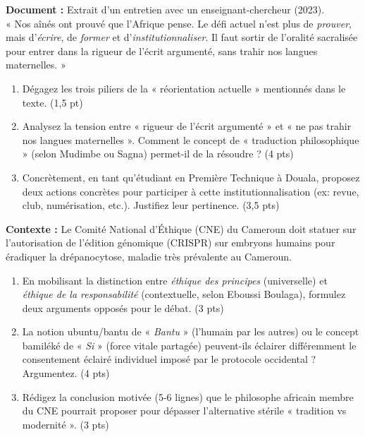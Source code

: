 \documentclass[11pt]{article}
\begin{document}
\begin{exercice}
\textbf{Document :} Extrait d'un entretien avec un enseignant-chercheur (2023).\\
« Nos aînés ont prouvé que l'Afrique pense. Le défi actuel n'est plus de \textit{prouver}, mais d'\textit{écrire}, de \textit{former} et d'\textit{institutionnaliser}. Il faut sortir de l'oralité sacralisée pour entrer dans la rigueur de l'écrit argumenté, sans trahir nos langues maternelles. »
\begin{enumerate}
    \item Dégagez les trois piliers de la « réorientation actuelle » mentionnés dans le texte. (1,5 pt)
    \item Analysez la tension entre « rigueur de l'écrit argumenté » et « ne pas trahir nos langues maternelles ». Comment le concept de « traduction philosophique » (selon Mudimbe ou Sagna) permet-il de la résoudre ? (4 pts)
    \item Concrètement, en tant qu'étudiant en Première Technique à Douala, proposez deux actions concrètes pour participer à cette institutionnalisation (ex: revue, club, numérisation, etc.). Justifiez leur pertinence. (3,5 pts)
\end{enumerate}
\end{exercice}

\begin{exercice}
\textbf{Contexte :} Le Comité National d'Éthique (CNE) du Cameroun doit statuer sur l'autorisation de l'édition génomique (CRISPR) sur embryons humains pour éradiquer la drépanocytose, maladie très prévalente au Cameroun.
\begin{enumerate}
    \item En mobilisant la distinction entre \textit{éthique des principes} (universelle) et \textit{éthique de la responsabilité} (contextuelle, selon Eboussi Boulaga), formulez deux arguments opposés pour le débat. (3 pts)
    \item La notion ubuntu/bantu de « \textit{Bantu} » (l'humain par les autres) ou le concept bamiléké de « \textit{Si} » (force vitale partagée) peuvent-ils éclairer différemment le consentement éclairé individuel imposé par le protocole occidental ? Argumentez. (4 pts)
    \item Rédigez la conclusion motivée (5-6 lignes) que le philosophe africain membre du CNE pourrait proposer pour dépasser l'alternative stérile « tradition vs modernité ». (3 pts)
\end{enumerate}
\end{exercice}
\end{document}
